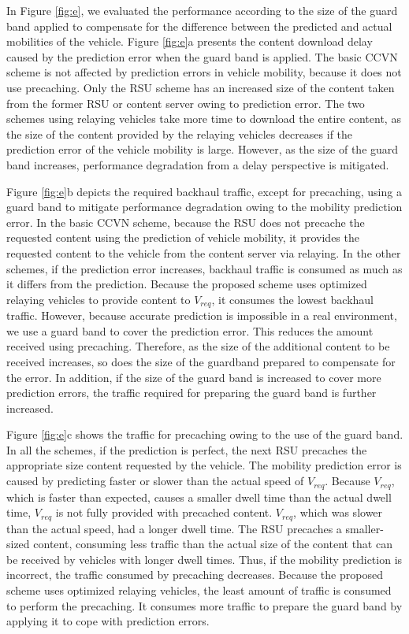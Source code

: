 \documentclass[electronics,aricle,accept,pdftex,moreauthors]{Definitions/mdpi}
\begin{document}
In Figure \ref{fig:e}, we evaluated the performance according to the size of the guard band applied to compensate for the difference between the predicted and actual mobilities of the vehicle. Figure \ref{fig:e}a presents the content download delay caused by the prediction error when the guard band is applied. The basic CCVN scheme is not affected by prediction errors in vehicle mobility, because it does not use precaching. Only the RSU scheme has an increased size of the content taken from the former RSU or content server owing to prediction error. The two schemes using relaying vehicles take more time to download the entire content, as the size of the content provided by the relaying vehicles decreases if the prediction error of the vehicle mobility is large. However, as the size of the guard band increases, performance degradation from a delay perspective is mitigated.

Figure \ref{fig:e}b depicts the required backhaul traffic, except for precaching, using a guard band to mitigate performance degradation owing to the mobility prediction error. In the basic CCVN scheme, because the RSU does not precache the requested content using the prediction of vehicle mobility, it provides the requested content to the vehicle from the content server via relaying. In the other schemes, if the prediction error increases, backhaul traffic is consumed as much as it differs from the prediction. Because the proposed scheme uses optimized relaying vehicles to provide content to ${V}_{req}$, it consumes the lowest backhaul traffic. However, because accurate prediction is impossible in a real environment, we use a guard band to cover the prediction error. This reduces the amount received using precaching. Therefore, as the size of the additional content to be received increases, so does the size of the guardband prepared to compensate for the error. In addition, if the size of the guard band is increased to cover more prediction errors, the traffic required for preparing the guard band is further increased.

Figure \ref{fig:e}c shows the traffic for precaching owing to the use of the guard band. In all the schemes, if the prediction is perfect, the next RSU precaches the appropriate size content requested by the vehicle. The mobility prediction error is caused by predicting faster or slower than the actual speed of ${V}_{req}$. Because ${V}_{req}$, which is faster than expected, causes a smaller dwell time than the actual dwell time, ${V}_{req}$ is not fully provided with precached content. ${V}_{req}$, which was slower than the actual speed, had a longer dwell time. The RSU precaches a smaller-sized content, consuming less traffic than the actual size of the content that can be received by vehicles with longer dwell times. Thus, if the mobility prediction is incorrect, the traffic consumed by precaching decreases. Because the proposed scheme uses optimized relaying vehicles, the least amount of traffic is consumed to perform the precaching. It consumes more traffic to prepare the guard band by applying it to cope with prediction errors.
\end{document}
